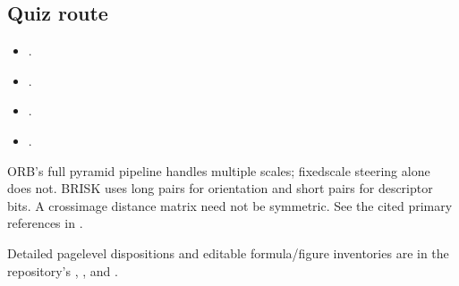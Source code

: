 \documentclass[letterpaper,11pt,english,openany,oneside]{jupyterBook}
\begin{document}
\subsection{Quiz route}
\label{\detokenize{lectures/lecture05/review:quiz-route}}\begin{itemize}
\item {}
\sphinxAtStartPar
{\hyperref[\detokenize{lectures/lecture05/quiz-workbook:quiz-13-q1}]{}}.

\item {}
\sphinxAtStartPar
{\hyperref[\detokenize{lectures/lecture05/quiz-workbook:quiz-9-q1}]{}}.

\item {}
\sphinxAtStartPar
{\hyperref[\detokenize{lectures/lecture05/quiz-workbook:quiz-a2-q1}]{}}.

\item {}
\sphinxAtStartPar
{\hyperref[\detokenize{lectures/lecture05/quiz-workbook:quiz-a3-q1}]{}}.

\end{itemize}

\sphinxAtStartPar
{} ORB’s full pyramid pipeline handles multiple scales; fixed\sphinxhyphen{}scale steering alone does not. BRISK uses long pairs for orientation and short pairs for descriptor bits. A cross\sphinxhyphen{}image distance matrix need not be symmetric. See the cited primary references in {\hyperref[\detokenize{lectures/lecture05/descriptors::doc}]{}}.

\sphinxAtStartPar
Detailed page\sphinxhyphen{}level dispositions and editable formula/figure inventories are in the repository’s , , and .

\sphinxstepscope
\end{document}
